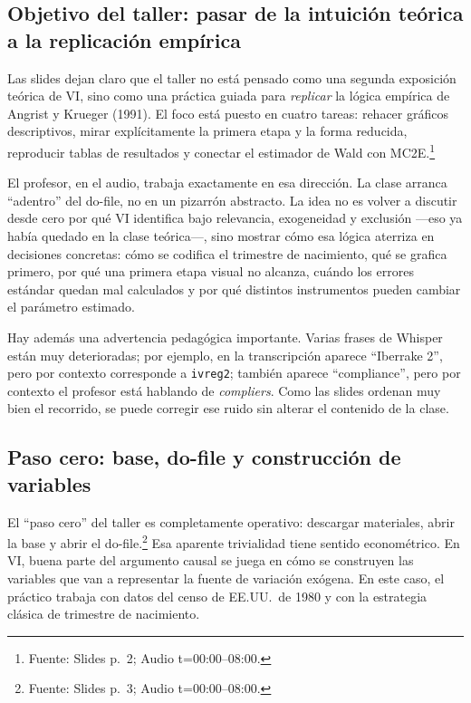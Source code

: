 \documentclass[11pt]{article}
\newcommand{\q}[1]{``#1''}
\newcommand{\source}[2]{\footnote{Fuente: Slides p.~#1; Audio t=#2.}}
\begin{document}
\subsection{Objetivo del taller: pasar de la intuición teórica a la replicación empírica}

Las slides dejan claro que el taller no está pensado como una segunda exposición teórica de VI, sino como una práctica guiada para \emph{replicar} la lógica empírica de Angrist y Krueger (1991). El foco está puesto en cuatro tareas: rehacer gráficos descriptivos, mirar explícitamente la primera etapa y la forma reducida, reproducir tablas de resultados y conectar el estimador de Wald con MC2E.\source{2}{00:00--08:00}

El profesor, en el audio, trabaja exactamente en esa dirección. La clase arranca \q{adentro} del do-file, no en un pizarrón abstracto. La idea no es volver a discutir desde cero por qué VI identifica bajo relevancia, exogeneidad y exclusión ---eso ya había quedado en la clase teórica---, sino mostrar cómo esa lógica aterriza en decisiones concretas: cómo se codifica el trimestre de nacimiento, qué se grafica primero, por qué una primera etapa visual no alcanza, cuándo los errores estándar quedan mal calculados y por qué distintos instrumentos pueden cambiar el parámetro estimado.

Hay además una advertencia pedagógica importante. Varias frases de Whisper están muy deterioradas; por ejemplo, en la transcripción aparece \q{Iberrake 2}, pero por contexto corresponde a \texttt{ivreg2}; también aparece \q{compliance}, pero por contexto el profesor está hablando de \emph{compliers}. Como las slides ordenan muy bien el recorrido, se puede corregir ese ruido sin alterar el contenido de la clase.

\subsection{Paso cero: base, do-file y construcción de variables}

El \q{paso cero} del taller es completamente operativo: descargar materiales, abrir la base y abrir el do-file.\source{3}{00:00--08:00} Esa aparente trivialidad tiene sentido econométrico. En VI, buena parte del argumento causal se juega en cómo se construyen las variables que van a representar la fuente de variación exógena. En este caso, el práctico trabaja con datos del censo de EE.UU.\ de 1980 y con la estrategia clásica de trimestre de nacimiento.
\end{document}
